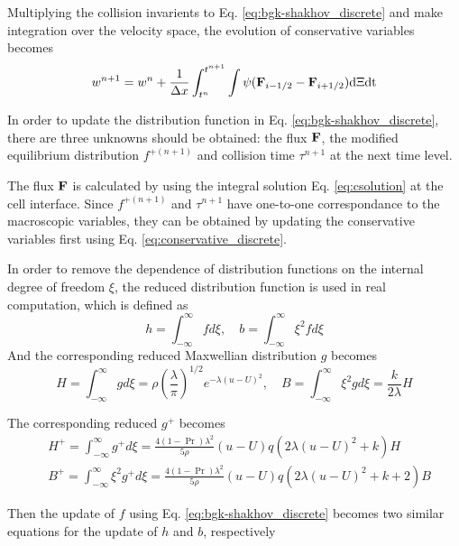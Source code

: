 \documentclass[a4paper]{book}
\begin{document}
Multiplying the collision invarients to Eq. \ref{eq:bgk-shakhov_discrete} and make integration over the velocity space, the evolution of conservative variables becomes
\begin{equation} 
    \label{eq:conservative_discrete}
    w^{n+1} = w^n+\frac{1}{\Delta x}\int_{t^n}^{t^{n+1}}\int\psi({\bf F}_{i-1/2}-{\bf F}_{i+1/2}){\rm d\Xi dt}
\end{equation}

In order to update the distribution function in Eq. \ref{eq:bgk-shakhov_discrete}, there are three unknowns should be obtained: the flux ${\bf F}$, the modified equilibrium distribution $f^{+(n+1)}$ and collision time $\tau^{n+1}$ at the next time level.

The flux ${\bf F}$ is calculated by using the integral solution Eq. \ref{eq:csolution} at the cell interface. Since $f^{+(n+1)}$ and $\tau^{n+1}$ have one-to-one correspondance to the macroscopic variables, they can be obtained by updating the conservative variables first using Eq. \ref{eq:conservative_discrete}.

In order to remove the dependence of distribution functions on the internal degree of freedom $\xi$, the reduced distribution function \cite{Yang1995} is used in real computation, which is defined as
\begin{equation} 
    h = \int_{-\infty}^{\infty}fd\xi,\quad b = \int_{-\infty}^{\infty}\xi^2 f d\xi
\end{equation} 
And the corresponding reduced Maxwellian distribution $g$ becomes
\begin{equation} 
    H = \int_{-\infty}^{\infty}gd\xi = \rho\left(\frac{\lambda}{\pi}\right)^{1/2}e^{-\lambda(u-U)^2},\quad B = \int_{-\infty}^{\infty}\xi^2 gd\xi =\frac{k}{2\lambda}H
\end{equation}

The corresponding reduced $g^+$ becomes
\begin{equation}
    \begin{aligned}
        & H^+ = \int_{-\infty}^{\infty}g^+d\xi = \frac{4(1-\Pr)\lambda^2}{5\rho}(u-U)q(2\lambda(u-U)^2+k)H \\
        & B^+ = \int_{-\infty}^{\infty}\xi^2g^+d\xi = \frac{4(1-\Pr)\lambda^2}{5\rho}(u-U)q(2\lambda(u-U)^2+k+2)B
    \end{aligned}
\end{equation}

Then the update of $f$ using Eq. \ref{eq:bgk-shakhov_discrete} becomes two similar equations for the update of $h$ and $b$, respectively
\end{document}
